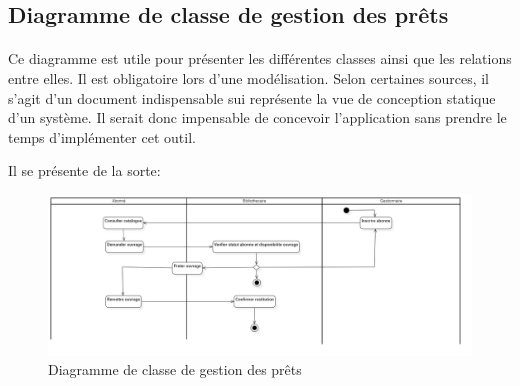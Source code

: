 \subsection{Diagramme de classe de gestion des prêts}
\paragraph{}

Ce diagramme est utile pour présenter les différentes classes ainsi que les relations 
entre elles. Il est obligatoire lors d'une modélisation. Selon certaines sources, il 
s'agit d'un document indispensable sui représente la vue de conception statique 
d'un système. Il serait donc impensable de concevoir l'application sans prendre le temps 
d'implémenter cet outil.
\par 
Il se présente de la sorte: \par 
\begin{figure}[h]
        \centering
        \includegraphics[width=1\textwidth]{ActivityDiagram1}
        \caption{Diagramme de classe de gestion des prêts}
        \label{image-ActivityDiagram1}
        \end{figure}
\par